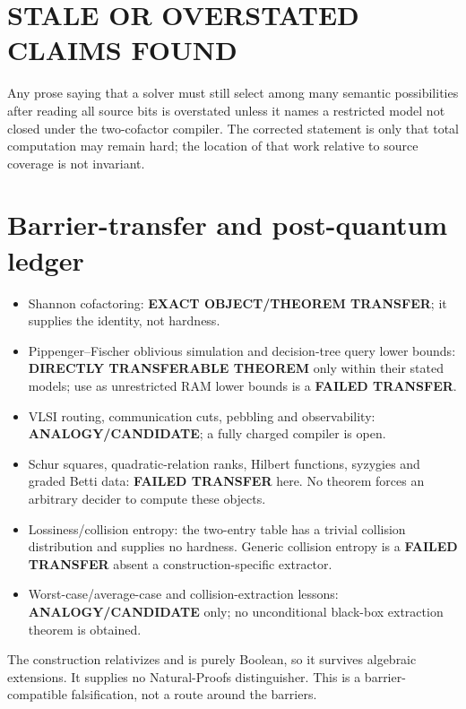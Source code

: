 \documentclass[11pt]{article}
\newcommand{\Status}[1]{\textbf{#1}}
\begin{document}
\section{STALE OR OVERSTATED CLAIMS FOUND}
Any prose saying that a solver must still select among many semantic
possibilities after reading all source bits is overstated unless it names a
restricted model not closed under the two-cofactor compiler. The corrected
statement is only that total computation may remain hard; the location of that
work relative to source coverage is not invariant.

\section{Barrier-transfer and post-quantum ledger}
\begin{itemize}
 \item Shannon cofactoring: \Status{EXACT OBJECT/THEOREM TRANSFER}; it supplies
 the identity, not hardness.
 \item Pippenger--Fischer oblivious simulation and decision-tree query lower
 bounds: \Status{DIRECTLY TRANSFERABLE THEOREM} only within their stated
 models; use as unrestricted RAM lower bounds is a \Status{FAILED TRANSFER}.
 \item VLSI routing, communication cuts, pebbling and observability:
 \Status{ANALOGY/CANDIDATE}; a fully charged compiler is open.
 \item Schur squares, quadratic-relation ranks, Hilbert functions, syzygies and
 graded Betti data: \Status{FAILED TRANSFER} here. No theorem forces an
 arbitrary decider to compute these objects.
 \item Lossiness/collision entropy: the two-entry table has a trivial collision
 distribution and supplies no hardness. Generic collision entropy is a
 \Status{FAILED TRANSFER} absent a construction-specific extractor.
 \item Worst-case/average-case and collision-extraction lessons:
 \Status{ANALOGY/CANDIDATE} only; no unconditional black-box extraction theorem
 is obtained.
\end{itemize}
The construction relativizes and is purely Boolean, so it survives algebraic
extensions. It supplies no Natural-Proofs distinguisher. This is a
barrier-compatible falsification, not a route around the barriers.
\end{document}

